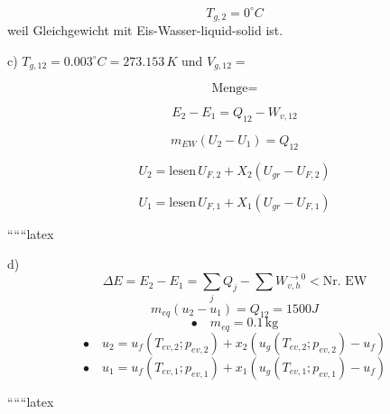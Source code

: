 \[ T_{g,2} = 0^\circ C \] weil Gleichgewicht mit Eis-Wasser-liquid-solid ist.

c) \( T_{g,12} = 0.003^\circ C = 273.153 \, K \) und \( V_{g,12} = \)

\[ \text{Menge} = \]

\[ E_2 - E_1 = Q_{12} - W_{v,12} \]

\[ m_{EW} (U_2 - U_1) = Q_{12} \]

\[ U_2 = \text{lesen} \, U_{F,2} + X_2 (U_{gr} - U_{F,2}) \]

\[ U_1 = \text{lesen} \, U_{F,1} + X_1 (U_{gr} - U_{F,1}) \]

``````latex


d) 
\[
\Delta E = E_2 - E_1 = \sum_j Q_j - \sum W_{v,h}^{\rightarrow 0} < \text{Nr. EW}
\]
\[
m_{eq}(u_2 - u_1) = Q_{12} = 1500J
\]
\[
\bullet \quad m_{eq} = 0.1 \, \text{kg}
\]
\[
\bullet \quad u_2 = u_f \left( T_{ev,2} ; p_{ev,2} \right) + x_2 \left( u_g \left( T_{ev,2} ; p_{ev,2} \right) - u_f \right)
\]
\[
\bullet \quad u_1 = u_f \left( T_{ev,1} ; p_{ev,1} \right) + x_1 \left( u_g \left( T_{ev,1} ; p_{ev,1} \right) - u_f \right)
\]

``````latex


